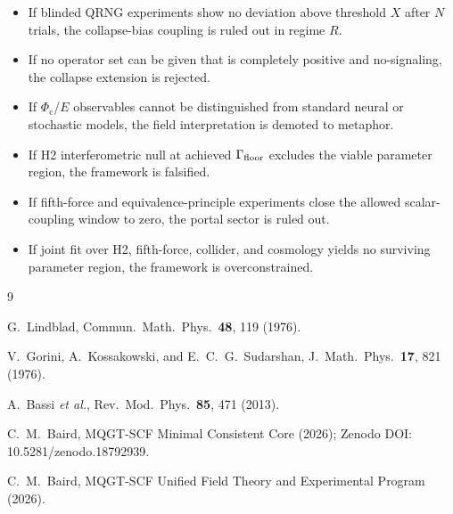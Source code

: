 \documentclass[reprint,amsmath,amssymb,aps,showkeys]{revtex4-2}
\newcommand{\Phic}{\Phi_{\mathrm{c}}}
\begin{document}
\begin{itemize}[leftmargin=*]
\item If blinded QRNG experiments show no deviation above threshold $X$ after $N$ trials, the collapse-bias coupling is ruled out in regime $R$.
\item If no operator set can be given that is completely positive and no-signaling, the collapse extension is rejected.
\item If $\Phic$/$E$ observables cannot be distinguished from standard neural or stochastic models, the field interpretation is demoted to metaphor.
\item If H2 interferometric null at achieved $\Gamma_{\rm floor}$ excludes the viable parameter region, the framework is falsified.
\item If fifth-force and equivalence-principle experiments close the allowed scalar-coupling window to zero, the portal sector is ruled out.
\item If joint fit over H2, fifth-force, collider, and cosmology yields no surviving parameter region, the framework is overconstrained.
\end{itemize}

\begin{thebibliography}{9}

G.~Lindblad, Commun.\ Math.\ Phys.\ \textbf{48}, 119 (1976).

V.~Gorini, A.~Kossakowski, and E.~C.~G.~Sudarshan, J.\ Math.\ Phys.\ \textbf{17}, 821 (1976).

A.~Bassi \emph{et al.}, Rev.\ Mod.\ Phys.\ \textbf{85}, 471 (2013).

C.~M.~Baird, MQGT-SCF Minimal Consistent Core (2026); Zenodo DOI: 10.5281/zenodo.18792939.

C.~M.~Baird, MQGT-SCF Unified Field Theory and Experimental Program (2026).

\end{thebibliography}
\end{document}
